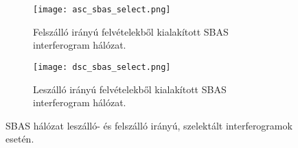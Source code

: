 \documentclass[12pt]{report}
\numberwithin{equation}{section}
\numberwithin{table}{section}
\numberwithin{figure}{section}
\begin{document}
\begin{center}
    \begin{figure}[H]
        \begin{subfigure}[t]{.49\linewidth}
            \centering
            \texttt{[image: asc\_sbas\_select.png]}
            \caption{Felszálló irányú felvételekből kialakított SBAS interferogram hálózat.}
        \end{subfigure}
        \hspace{10pt}
        \begin{subfigure}[t]{.49\linewidth}
            \centering
            \texttt{[image: dsc\_sbas\_select.png]}
            \caption{Leszálló irányú felvételekből kialakított SBAS interferogram hálózat.}
        \end{subfigure}
    \caption{SBAS hálózat leszálló- és felszálló irányú, szelektált interferogramok esetén.}\label{asc_dsc_sbas}
    \end{figure}
\end{center}
\end{document}
